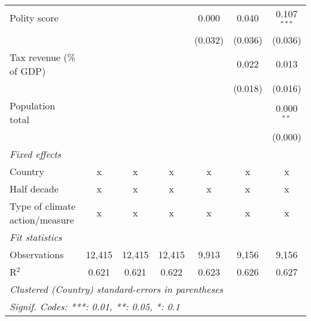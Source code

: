 \begin{tabular}{lcccccc}
   Polity score                                               &              &               &                & 0.000          & 0.040          & 0.107$^{***}$\\   
                                                              &              &               &                & (0.032)        & (0.036)        & (0.036)\\   
   Tax revenue (\% of GDP)                                    &              &               &                &                & 0.022          & 0.013\\   
                                                              &              &               &                &                & (0.018)        & (0.016)\\   
   Population total                                           &              &               &                &                &                & 0.000$^{**}$\\   
                                                              &              &               &                &                &                & (0.000)\\   
   \emph{Fixed effects}\\
   Country                                                    & x            & x             & x              & x              & x              & x\\  
   Half decade                                                & x            & x             & x              & x              & x              & x\\  
   Type of climate action/measure                             & x            & x             & x              & x              & x              & x\\  
   \midrule \emph{Fit statistics}\\
   Observations                                               & 12,415       & 12,415        & 12,415         & 9,913          & 9,156          & 9,156\\  
   R$^2$                                                      & 0.621        & 0.621         & 0.622          & 0.623          & 0.626          & 0.627\\  
   \midrule
   \multicolumn{7}{l}{\emph{Clustered (Country) standard-errors in parentheses}}\\
   \multicolumn{7}{l}{\emph{Signif. Codes: ***: 0.01, **: 0.05, *: 0.1}}\\
\end{tabular}
\par\endgroup


